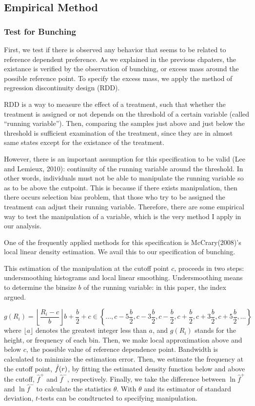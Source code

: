 \documentclass[dvipdfmx, 12pt]{article}
\begin{document}
 \subsection{Empirical Method}

  \subsubsection{Test for Bunching}

  First, we test if there is observed any behavior that seems to be related to reference dependent preference. As we explained in the previous chpaters, the existance is verified by the observation of bunching, or excess mass around the possible reference point. To specify the excess mass, we apply the method of regression discontinuity design (RDD).

  RDD is a way to measure the effect of a treatment, such that whether the treatment is assigned or not depends on the threshold of a certain variable (called ``running variable''). Then, comparing the samples just above and just below the threshold is sufficient examination of the treatment, since they are in almost same states except for the existance of the treatment.

  However, there is an important assumption for this specification to be valid (Lee and Lemieux, 2010): continuity of the running variable around the threshold. In other words, individuals must not be able to manipulate the running variable so as to be above the cutpoint. This is because if there exists manipulation, then there occurs selection bias problem, that those who try to be assigned the treatment can adjust their running variable. Therefore, there are some empirical way to test the manipulation of a variable, which is the very method I apply in our analysis.

  One of the frequently applied methods for this specification is  McCrary(2008)'s local linear density estimation. We avail this to our specification of bunching.

  This estimation of the manipulation at the cutoff point $c$, proceeds in two steps: undersmoothing histograms and local linear smoothing. Undersmoothing means to determine the binsize $b$ of the running variable: in this paper, the index argued.

  \[
  g(R_i) = \left \lfloor \dfrac{R_i - c}{b} \right \rfloor b
  + \dfrac{b}{2} + c \in \left \{ \ldots, c-5\dfrac{b}{2},  c-3\dfrac{b}{2}, c-\dfrac{b}{2}, c+\dfrac{b}{2}, c+3\dfrac{b}{2}, c+5\dfrac{b}{2}, \ldots \right \}
  \]
  where $\lfloor a \rfloor$ denotes the greatest integer less than $a$, and $g(R_i)$ stands for the height, or frequency of each bin. Then, we make local approximation above and below $c$, the possible value of reference dependence point. Bandwidth is calculated to minimize the estimation error. Then, we estimate the frequency at the cutoff point, $\Hat{f}(r)$, by fitting the estimated density function below and above the cutoff, $\hat{f}^+$ and $\hat{f}^-$, respectively. Finally, we take the difference between $\ln \hat{f}^+$ and $\ln \hat{f}^-$ to calculate the statistics $\theta$. With $\theta$ and its estimator of standard deviation, $t$-tests can be condtructed to specifying manipulation.
\end{document}
